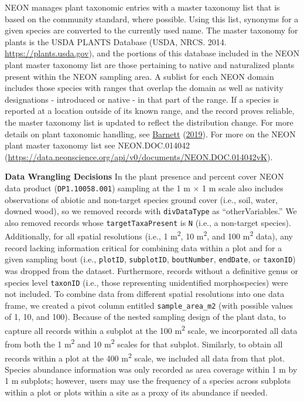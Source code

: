 \documentclass[
  12pt,
]{article}
\begin{document}
NEON manages plant taxonomic entries with a master taxonomy list that is based on the community standard, where possible. Using this list, synonyms for a given species are converted to the currently used name. The master taxonomy for plants is the USDA PLANTS Database (USDA, NRCS. 2014. \url{https://plants.usda.gov}), and the portions of this database included in the NEON plant master taxonomy list are those pertaining to native and naturalized plants present within the NEON sampling area. A sublist for each NEON domain includes those species with ranges that overlap the domain as well as nativity designations - introduced or native - in that part of the range. If a species is reported at a location outside of its known range, and the record proves reliable, the master taxonomy list is updated to reflect the distribution change. For more details on plant taxonomic handling, see \protect\hyperlink{ref-Barnett2019}{Barnett} (\protect\hyperlink{ref-Barnett2019}{2019}). For more on the NEON plant master taxonomy list see NEON.DOC.014042 (\url{https://data.neonscience.org/api/v0/documents/NEON.DOC.014042vK}).

\textbf{Data Wrangling Decisions} In the plant presence and percent cover NEON data product (\texttt{DP1.10058.001}) sampling at the 1 m \(\times\) 1 m scale also includes observations of abiotic and non-target species ground cover (i.e., soil, water, downed wood), so we removed records with \texttt{divDataType} as ``otherVariables.'' We also removed records whose \texttt{targetTaxaPresent} is \texttt{N} (i.e., a non-target species). Additionally, for all spatial resolutions (i.e., 1 m\textsuperscript{2}, 10 m\textsuperscript{2}, and 100 m\textsuperscript{2} data), any record lacking information critical for combining data within a plot and for a given sampling bout (i.e., \texttt{plotID}, \texttt{subplotID}, \texttt{boutNumber}, \texttt{endDate}, or \texttt{taxonID}) was dropped from the dataset. Furthermore, records without a definitive genus or species level \texttt{taxonID} (i.e., those representing unidentified morphospecies) were not included. To combine data from different spatial resolutions into one data frame, we created a pivot column entitled \texttt{sample\_area\_m2} (with possible values of 1, 10, and 100). Because of the nested sampling design of the plant data, to capture all records within a subplot at the 100 m\textsuperscript{2} scale, we incorporated all data from both the 1 m\textsuperscript{2} and 10 m\textsuperscript{2} scales for that subplot. Similarly, to obtain all records within a plot at the 400 m\textsuperscript{2} scale, we included all data from that plot. Species abundance information was only recorded as area coverage within 1 m by 1 m subplots; however, users may use the frequency of a species across subplots within a plot or plots within a site as a proxy of its abundance if needed.
\end{document}
